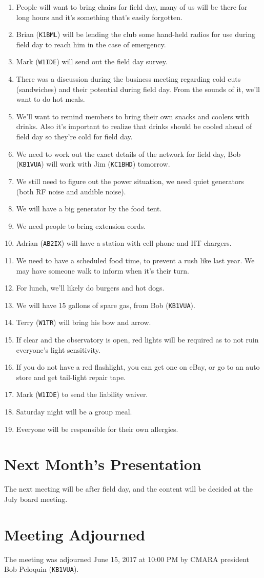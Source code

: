 \documentclass[10pt,letterpaper]{article}
\begin{document}
\begin{enumerate}
  \item People will want to bring chairs for field day, many of us will be there for long hours and it's something that's easily forgotten.
  \item Brian (\texttt{K1BML}) will be lending the club some hand-held radios for use during field day to reach him in the case of emergency.
  \item Mark (\texttt{W1IDE}) will send out the field day survey.
  \item There was a discussion during the business meeting regarding cold cuts (sandwiches) and their potential during field day. From the sounds of it, we'll want to do hot meals.
  \item We'll want to remind members to bring their own snacks and coolers with drinks. Also it's important to realize that drinks should be cooled ahead of field day so they're cold for field day.
  \item We need to work out the exact details of the network for field day, Bob (\texttt{KB1VUA}) will work with Jim (\texttt{KC1BHD}) tomorrow.
  \item We still need to figure out the power situation, we need quiet generators (both RF noise and audible noise).
  \item We will have a big generator by the food tent.
  \item We need people to bring extension cords.
  \item Adrian (\texttt{AB2IX}) will have a station with cell phone and HT chargers.
  \item We need to have a scheduled food time, to prevent a rush like last year. We may have someone walk to inform when it's their turn.
  \item For lunch, we'll likely do burgers and hot dogs.
  \item We will have 15 gallons of spare gas, from Bob (\texttt{KB1VUA}).
  \item Terry (\texttt{W1TR}) will bring his bow and arrow.
  \item If clear and the observatory is open, red lights will be required as to not ruin everyone's light sensitivity.
  \item If you do not have a red flashlight, you can get one on eBay, or go to an auto store and get tail-light repair tape.
  \item Mark (\texttt{W1IDE}) to send the liability waiver.
  \item Saturday night will be a group meal.
  \item Everyone will be responsible for their own allergies.
\end{enumerate}

\section{Next Month's Presentation}
The next meeting will be after field day, and the content will be decided at the July board meeting.

\section{Meeting Adjourned}
The meeting was adjourned June 15, 2017 at 10:00 PM by CMARA president Bob Peloquin (\texttt{KB1VUA}).
\end{document}
